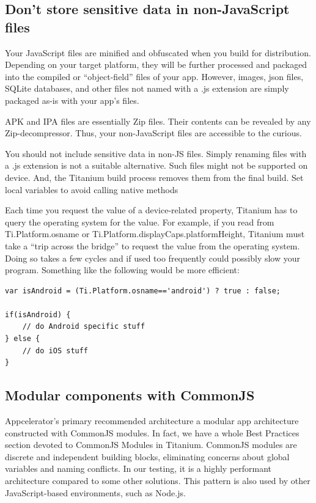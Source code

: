 \documentclass[11pt]{book}
\begin{document}
\subsection{Don't store sensitive data in non-JavaScript files}
Your JavaScript files are minified and obfuscated when you build for distribution. Depending on your target platform, they will be further processed and packaged into the compiled or ``object-field'' files of your app. However, images, \gls{json} files, SQLite databases, and other files not named with a .js extension are simply packaged as-is with your app's files.

APK and IPA files are essentially Zip files. Their contents can be revealed by any Zip-decompressor. Thus, your non-JavaScript files are accessible to the curious.

You should not include sensitive data in non-JS files. Simply renaming files with a .js extension is not a suitable alternative. Such files might not be supported on device. And, the Titanium build process removes them from the final build.
Set local variables to avoid calling native methods

Each time you request the value of a device-related property, Titanium has to query the operating system for the value. For example, if you read from Ti.Platform.osname or Ti.Platform.displayCaps.platformHeight, Titanium must take a ``trip across the bridge'' to request the value from the operating system. Doing so takes a few cycles and if used too frequently could possibly slow your program. Something like the following would be more efficient:

\begin{lstlisting}[frame=single]
var isAndroid = (Ti.Platform.osname=='android') ? true : false;

if(isAndroid) {
    // do Android specific stuff
} else {
    // do iOS stuff
}
\end{lstlisting}

\subsection{Modular components with CommonJS}
Appcelerator's primary recommended architecture a modular app architecture constructed with CommonJS modules. In fact, we have a whole Best Practices section devoted to CommonJS Modules in Titanium. CommonJS modules are discrete and independent building blocks, eliminating concerns about global variables and naming conflicts. In our testing, it is a highly performant architecture compared to some other solutions. This pattern is also used by other JavaScript-based environments, such as Node.js.
\end{document}

